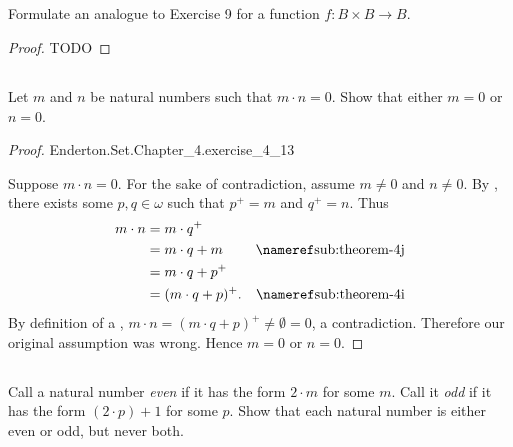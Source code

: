 \documentclass{report}
\begin{document}
\subsection{}%

Formulate an analogue to Exercise 9 for a function
  $f \colon B \times B \rightarrow B$.

\begin{proof}

  TODO

\end{proof}

\subsection{}%

Let $m$ and $n$ be natural numbers such that $m \cdot n = 0$.
Show that either $m = 0$ or $n = 0$.

\begin{proof}

    {Enderton.Set.Chapter\_4.exercise\_4\_13}

  Suppose $m \cdot n = 0$.
  For the sake of contradiction, assume $m \neq 0$ and $n \neq 0$.
  By , there exists some $p, q \in \omega$ such that
    $p^+ = m$ and $q^+ = n$.
  Thus
    \begin{align*}
      m \cdot n
        & = m \cdot q^+ \\
        & = m \cdot q + m & \textref{sub:theorem-4j} \\
        & = m \cdot q + p^+ \\
        & = (m \cdot q + p)^+. & \textref{sub:theorem-4i}
    \end{align*}
  By definition of a ,
    $m \cdot n = (m \cdot q + p)^+ \neq \emptyset = 0$, a contradiction.
  Therefore our original assumption was wrong.
  Hence $m = 0$ or $n = 0$.

\end{proof}

\subsection{}%

Call a natural number \textit{even} if it has the form $2 \cdot m$ for some $m$.
Call it \textit{odd} if it has the form $(2 \cdot p) + 1$ for some $p$.
Show that each natural number is either even or odd, but never both.
\end{document}
